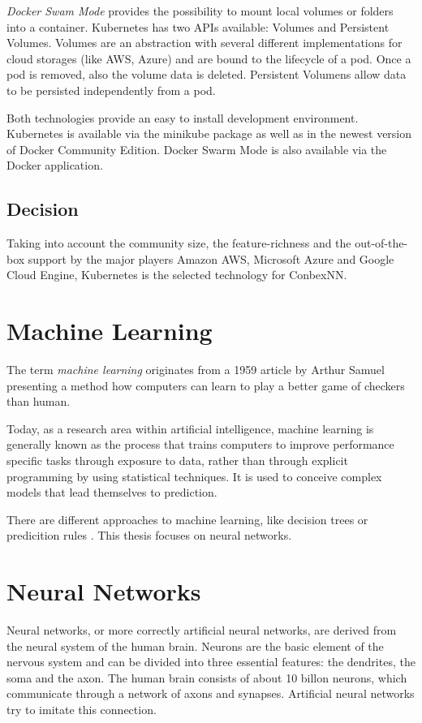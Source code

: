 \emph{Docker Swam Mode} provides the possibility to mount local volumes
or folders into a container. Kubernetes has two APIs available: Volumes
and Persistent Volumes. Volumes are an abstraction with several
different implementations for cloud storages (like AWS, Azure) and are
bound to the lifecycle of a pod. Once a pod is removed, also the volume
data is deleted. Persistent Volumens allow data to be persisted
independently from a pod.

Both technologies provide an easy to install development environment.
Kubernetes is available via the minikube package as well as in the
newest version of Docker Community Edition. Docker Swarm Mode is also
available via the Docker application.

\subsection{Decision}\label{decision}

Taking into account the community size, the feature-richness and the
out-of-the-box support by the major players Amazon AWS, Microsoft Azure
and Google Cloud Engine, Kubernetes is the selected technology for
ConbexNN.

\section{Machine Learning}\label{machine-learning}

The term \emph{machine learning} originates from a 1959 article by
Arthur Samuel \cite{Samuel59somestudies} presenting a method how
computers can learn to play a better game of checkers than human.

Today, as a research area within artificial intelligence, machine
learning is generally known as the process that trains computers to
improve performance specific tasks through exposure to data, rather than
through explicit programming by using statistical techniques. It is used
to conceive complex models that lead themselves to prediction.

There are different approaches to machine learning, like decision trees
or predicition rules \cite{michalski2013machine}. This thesis focuses on
neural networks.

\section{Neural Networks}\label{neural-networks}

Neural networks, or more correctly artificial neural networks, are
derived from the neural system of the human brain. Neurons are the basic
element of the nervous system and can be divided into three essential
features: the dendrites, the soma and the axon. The human brain consists
of about 10 billon neurons, which communicate through a network of axons
and synapses. Artificial neural networks try to imitate this connection.
\cite{haun1998simulation}

